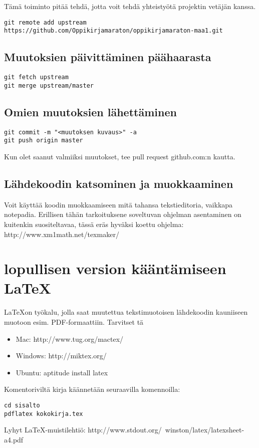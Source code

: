Tämä toiminto pitää tehdä, jotta voit tehdä yhteistyötä projektin vetäjän kanssa.

\begin{verbatim}
git remote add upstream https://github.com/Oppikirjamaraton/oppikirjamaraton-maa1.git
\end{verbatim}

\subsection{Muutoksien päivittäminen päähaarasta}

\begin{verbatim}
git fetch upstream
git merge upstream/master
\end{verbatim}

\subsection{Omien muutoksien lähettäminen}

\begin{verbatim}
git commit -m "<muutoksen kuvaus>" -a
git push origin master
\end{verbatim}

Kun olet saanut valmiiksi muutokset, tee pull request github.com:n kautta.

\subsection{Lähdekoodin katsominen ja muokkaaminen}

Voit käyttää koodin muokkaamiseen mitä tahansa tekstieditoria, vaikkapa notepadia. Erillisen tähän tarkoituksene soveltuvan ohjelman asentaminen on kuitenkin suositeltavaa, tässä eräs hyväksi koettu ohjelma: http://www.xm1math.net/texmaker/

\section{lopullisen version kääntämiseen \LaTeX}

\LaTeX on työkalu, jolla saat muutettua tekstimuotoisen lähdekoodin kauniiseen muotoon esim. PDF-formaattiin. Tarvitset tä

\begin{itemize}

\item Mac: http://www.tug.org/mactex/
\item Windows: http://miktex.org/
\item Ubuntu: aptitude install latex

\end{itemize}

Komentoriviltä kirja käännetään seuraavilla komennoilla:

\begin{verbatim}
cd sisalto
pdflatex kokokirja.tex
\end{verbatim}

Lyhyt \LaTeX -muistilehtiö: http://www.stdout.org/~winston/latex/latexsheet-a4.pdf

